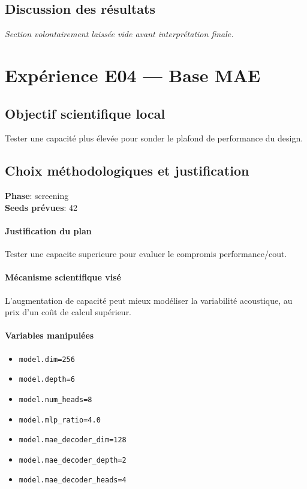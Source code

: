\documentclass[11pt,a4paper]{article}
\begin{document}
\subsection{Discussion des résultats}
\textit{Section volontairement laissée vide avant interprétation finale.}


\section{Expérience E04 --- Base MAE}
\subsection{Objectif scientifique local}
Tester une capacité plus élevée pour sonder le plafond de performance du design.

\subsection{Choix méthodologiques et justification}
\textbf{Phase}: screening\\
\textbf{Seeds prévues}: 42\\


\paragraph{Justification du plan}
Tester une capacite superieure pour evaluer le compromis performance/cout.

\paragraph{Mécanisme scientifique visé}
L'augmentation de capacité peut mieux modéliser la variabilité acoustique, au prix d'un coût de calcul supérieur.

\paragraph{Variables manipulées}
\begin{itemize}
\item \texttt{model.dim=256}
\item \texttt{model.depth=6}
\item \texttt{model.num\_heads=8}
\item \texttt{model.mlp\_ratio=4.0}
\item \texttt{model.mae\_decoder\_dim=128}
\item \texttt{model.mae\_decoder\_depth=2}
\item \texttt{model.mae\_decoder\_heads=4}
\end{itemize}
\end{document}
